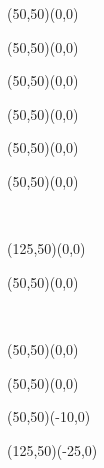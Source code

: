 	\begin{figure}[H]
		\vspace{1cm}
		\begin{center}
		\begin{picture}(50,50)(0,0)
		\end{picture}
		\begin{picture}(50,50)(0,0)
		\end{picture}
		\begin{picture}(50,50)(0,0)
		\end{picture}
		\begin{picture}(50,50)(0,0)
		\end{picture}
		\begin{picture}(50,50)(0,0)
		\end{picture}
		\begin{picture}(50,50)(0,0)
		\end{picture}\\[2cm]
		\end{center}
	\end{figure}
	

	\begin{figure}[H]
		\vspace{1cm}
		\begin{center}
		\begin{picture}(125,50)(0,0)
		\end{picture}
		\begin{picture}(50,50)(0,0)
		\end{picture}
		\\[2cm]
		\end{center}
	\end{figure}
	
	\begin{figure}[H]
		\vspace{1cm}
		\begin{center}
		\begin{picture}(50,50)(0,0)
		\end{picture}
		\begin{picture}(50,50)(0,0)
		\end{picture}
		\begin{picture}(50,50)(-10,0)
		\end{picture}
		\begin{picture}(125,50)(-25,0)
		\end{picture}\\[2 cm]
		\end{center}
	\end{figure}
	
